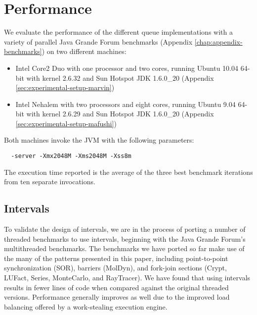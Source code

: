 
\chapter{Performance}
\label{chap:queues-performance}

We evaluate the performance of the different queue implementations
with a variety of parallel Java Grande Forum benchmarks (Appendix
\ref{chap:appendix-benchmarks}) on two different machines:

\begin{itemize}
\item Intel Core2 Duo with one processor and two cores, running Ubuntu
  10.04 64-bit with kernel 2.6.32 and Sun Hotspot JDK 1.6.0\_20
  (Appendix \ref{sec:experimental-setup-marvin})
\item Intel Nehalem with two processors and eight cores, running
  Ubuntu 9.04 64-bit with kernel 2.6.29 and Sun Hotspot JDK 1.6.0\_20
  (Appendix \ref{sec:experimental-setup-mafushi})
\end{itemize}

Both machines invoke the JVM with the following parameters:

\begin{lstlisting}
  -server -Xmx2048M -Xms2048M -Xss8m
\end{lstlisting}

The execution time reported is the average of the three best benchmark
iterations from ten separate invocations.


\section{Intervals}
\label{sec:queues-performance-intervals}

To validate the design of intervals, we are in the process of porting
a number of threaded benchmarks to use intervals, beginning with the
Java Grande Forum's multithreaded benchmarks. The benchmarks we have
ported so far make use of the many of the patterns presented in this
paper, including point-to-point synchronization (SOR), barriers
(MolDyn), and fork-join sections (Crypt, LUFact, Series, MonteCarlo,
and RayTracer). We have found that using intervals results in fewer
lines of code when compared against the original threaded
versions. Performance generally improves as well due to the improved
load balancing offered by a work-stealing execution engine.

